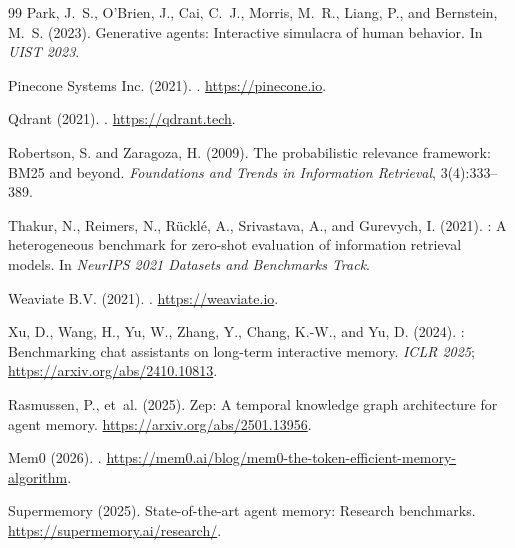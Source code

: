 \documentclass[11pt,twocolumn]{article}
\begin{document}
\begin{thebibliography}{99}
Park, J.~S., O'Brien, J., Cai, C.~J., Morris, M.~R., Liang, P., and Bernstein,
  M.~S. (2023).
\newblock Generative agents: Interactive simulacra of human behavior.
\newblock In \emph{UIST 2023}.

Pinecone Systems Inc. (2021).
.
\newblock \url{https://pinecone.io}.

Qdrant (2021).
.
\newblock \url{https://qdrant.tech}.

Robertson, S. and Zaragoza, H. (2009).
\newblock The probabilistic relevance framework: {BM25} and beyond.
\newblock \emph{Foundations and Trends in Information Retrieval}, 3(4):333--389.

Thakur, N., Reimers, N., R{\"u}ckl{\'e}, A., Srivastava, A., and Gurevych, I.
  (2021).
: A heterogeneous benchmark for zero-shot evaluation of
  information retrieval models.
\newblock In \emph{NeurIPS 2021 Datasets and Benchmarks Track}.

Weaviate B.V. (2021).
.
\newblock \url{https://weaviate.io}.

Xu, D., Wang, H., Yu, W., Zhang, Y., Chang, K.-W., and Yu, D. (2024).
: Benchmarking chat assistants on long-term interactive memory.
\newblock \emph{ICLR 2025}; \url{https://arxiv.org/abs/2410.10813}.

Rasmussen, P., et~al. (2025).
\newblock Zep: A temporal knowledge graph architecture for agent memory.
\newblock \url{https://arxiv.org/abs/2501.13956}.

Mem0 (2026).
.
\newblock \url{https://mem0.ai/blog/mem0-the-token-efficient-memory-algorithm}.

Supermemory (2025).
\newblock State-of-the-art agent memory: Research benchmarks.
\newblock \url{https://supermemory.ai/research/}.

\end{thebibliography}
\end{document}
